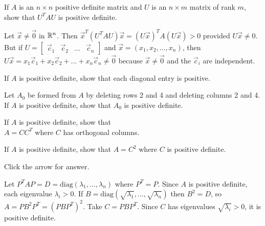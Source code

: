 \documentclass{ximera}
\begin{document}
\begin{problem}\label{prob:pos_def_6}
If $A$ is an $n \times n$ positive definite matrix and $U$ is an $n \times m$ matrix of rank $m$, show that $U^{T}AU$ is positive definite.

\begin{hint}
Let $\vec{x} \neq \vec{0}$ in $\mathbb{R}^n$. Then $\vec{x}^{T}(U^{T}AU)\vec{x} = (U\vec{x})^{T}A(U\vec{x}) > 0$ provided $U\vec{x} \neq 0$. But if $U = \left[ \begin{array}{cccc}
\vec{c}_{1} & \vec{c}_{2} & \dots &  \vec{c}_{n}
\end{array}\right]$ and $\vec{x} = (x_{1}, x_{2}, \dots, x_{n})$, then $U\vec{x} = x_{1}\vec{c}_{1} + x_{2}\vec{c}_{2} + \dots  + x_{n}\vec{c}_{n} \neq \vec{0}$ because $\vec{x} \neq \vec{0}$ and the $\vec{c}_{i}$ are independent.
\end{hint}
\end{problem}

\begin{problem}\label{prob:pos_def_7}
If $A$ is positive definite, show that each diagonal entry is positive.
\end{problem}

\begin{problem}\label{prob:pos_def_8}
Let $A_{0}$ be formed from $A$ by deleting rows 2 and 4 and deleting columns 2 and 4. If $A$ is positive definite, show that $A_{0}$ is positive definite.
\end{problem}

\begin{problem}\label{prob:pos_def_9}
If $A$ is positive definite, show that \\ $A = CC^{T}$ where $C$ has orthogonal columns.
\end{problem}

\begin{problem}\label{prob:pos_def_10}
If $A$ is positive definite, show that $A = C^{2}$ where $C$ is positive definite.

Click the arrow for answer.
\begin{expandable}{}{}
Let $P^{T}AP = D = \mbox{diag}(\lambda_{1}, \dots, \lambda_{n})$ where $P^{T} = P$. Since $A$ is positive definite, each eigenvalue $\lambda_{i} > 0$. If $B = \mbox{diag}(\sqrt{\lambda_{1}}, \dots, \sqrt{\lambda_{n}})$ then $B^{2} = D$, so $A = PB^{2}P^{T} = (PBP^{T})^{2}$. Take $C = PBP^{T}$. Since $C$ has eigenvalues $\sqrt{\lambda_{i}} > 0$, it is positive definite.
\end{expandable}
\end{problem}
\end{document}
